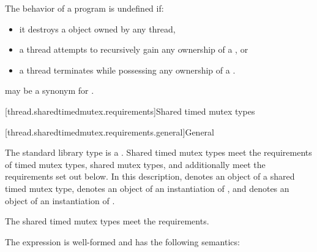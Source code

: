 \pnum
The behavior of a program is undefined if:
\begin{itemize}
\item it destroys a  object owned by any thread,
\item a thread attempts to recursively gain any ownership of a , or
\item a thread terminates while possessing any ownership of a .
\end{itemize}

\pnum
{} may be a synonym for .

[thread.sharedtimedmutex.requirements]{Shared timed mutex types}

[thread.sharedtimedmutex.requirements.general]{General}

\pnum
The standard library type  is a
. Shared timed mutex types meet the requirements of
timed mutex types,
shared mutex types, and additionally
meet the requirements set out below. In this description,
 denotes an object of a shared timed mutex type,
 denotes an object of an instantiation of
, and
 denotes an object of an instantiation of
.
\begin{note}
The shared timed mutex types meet the 
requirements.
\end{note}

\pnum
The expression  is well-formed and
has the following semantics:

